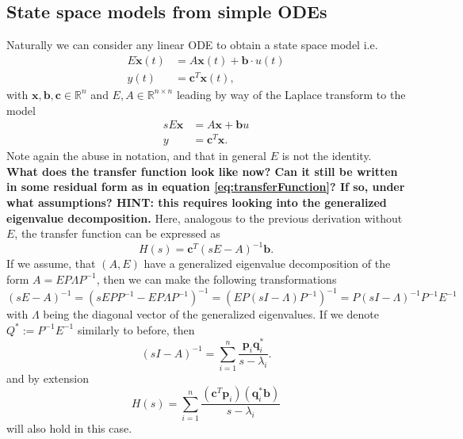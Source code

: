 \documentclass{article}
\begin{document}
	\subsection{State space models from simple ODEs}
	Naturally we can consider any linear ODE to obtain a state space model i.e.
	\begin{equation}\label{eq:simpleODE}
		\begin{aligned}
			E\dot{\mathbf{x}}(t)&=A\mathbf{x}(t)+\mathbf{b}\cdot u(t)\\
			y(t)&=\mathbf{c}^{T}\mathbf{x}(t),
		\end{aligned}
	\end{equation}
	with $\mathbf{x},\mathbf{b},\mathbf{c}\in\mathbb{R}^{n}$ and $E,A\in\mathbb{R}^{n\times n}$ leading by way of the Laplace transform to the model
	\begin{equation}\label{eq:SSmodelfromSimpleODE}
		\begin{aligned}
			sE\mathbf{x}&=A\mathbf{x}+\mathbf{b}u\\
			y&=\mathbf{c}^{T}\mathbf{x}.
		\end{aligned}
	\end{equation}
	Note again the abuse in notation, and that in general $E$ is not the identity.
	\textbf{ What does the transfer function look like now? Can it still be written in some residual form as in equation \ref{eq:transferFunction}? If so, under what assumptions? HINT: this requires looking into the generalized eigenvalue decomposition.}
	Here, analogous to the previous derivation without $E$, the transfer function can be expressed as 
	\begin{equation}
		H(s) = \textbf{c}^T \left(sE - A\right)^{-1} \textbf{b}.
	\end{equation}
	If we assume, that $(A, E)$ have a generalized eigenvalue decomposition of the form $A = E P \Lambda P^{-1}$, then we can make the following transformations
	\begin{equation}
		\left(sE - A\right)^{-1} = \left(sEP P^{-1}-EP\Lambda P^{-1}\right)^{-1} = \left(EP\left(s I -\Lambda\right) P^{-1}\right)^{-1} = P \left(s I -\Lambda\right)^{-1} P^{-1} E^{-1}
	\end{equation}
	with $\Lambda$ being the diagonal vector of the generalized eigenvalues. If we denote $Q^\ast := P^{-1}E^{-1} $ similarly to before, then 
	\begin{equation}
		(sI-A)^{-1}=\sum_{i=1}^{n}\frac{\mathbf{p}_i\mathbf{q}_i^{\ast}}{s-\lambda_i}.
	\end{equation}
	and by extension
	\begin{equation}
		H(s)
		=\sum_{i=1}^n \frac{(\mathbf{c}^T\mathbf{p}_i)(\mathbf{q}_i^{\ast}\mathbf{b})}{s-\lambda_i}
	\end{equation}
	will also hold in this case.
	
\end{document}
